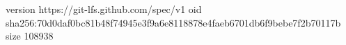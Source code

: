 version https://git-lfs.github.com/spec/v1
oid sha256:70d0daf0bc81b48f74945e3f9a6e8118878e4faeb6701db6f9bebe7f2b70117b
size 108938
